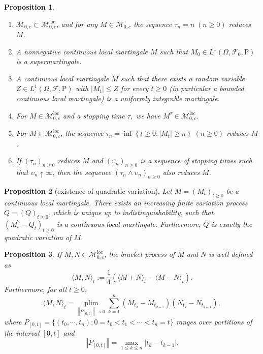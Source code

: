 \documentclass{report}
\newtheorem{proposition}{Proposition}[section]
\theoremstyle{nonumberplain}
\begin{document}
\begin{proposition}~\\
	\begin{enumerate}
		\item $\mathscr{M}_{0,c}\subset\mathscr{M}^{\mathrm{loc}}_{0,c}$, and for any $M\in\mathscr{M}_{0,c}$ the sequence $\tau_{n}=n\;(n\ge0)$ reduces $M$. 
		\item A nonnegative continuous local martingale $M$ such that $M_{0} \in L^{1}(\Omega,\mathcal{F}_0,\mathrm{P})$ is a supermartingale.
		\item A continuous local martingale $M$ such that there exists a random variable $Z \in L^{1}(\Omega,\mathcal{F},\mathrm{P})$ with $\left|M_{t}\right| \leq Z$ for every $t \geq 0$ (in particular a bounded continuous local martingale) is a uniformly integrable martingale.
		\item For $M \in \mathscr{M}^{\mathrm{loc}}_{0,c}$ and a stopping time $\tau,$ we have $M^{\tau} \in \mathscr{M}^{\mathrm{loc}}_{0,c}$.
		\item For $M \in \mathscr{M}^{\mathrm{loc}}_{0,c}$, the sequence
		$\tau_{n}=\inf \left\{t \geq 0:\left|M_{t}\right| \geq n\right\}\;(n\ge0)$	reduces $M$.
		\item If $\left(\tau_{n}\right)_{n\ge0}$ reduces $M$ and $\left(\upsilon_{n}\right)_{n\ge0}$ is a sequence of stopping times such that $\upsilon_{n} \uparrow \infty$, then the sequence $\left(\tau_{n} \wedge \upsilon_{n}\right)_{n\ge0}$ also reduces $M$.
	\end{enumerate}
\end{proposition}

\begin{proposition}[existence of quadratic variation]	
	Let $M=\left(M_{t}\right)_{t \geq 0}$ be a continuous local martingale. There exists an	increasing finite variation process $Q=\left(Q\right)_{t \geq 0}$, which is unique up to indistinguishability, such that $(M_{t}^{2}-Q_{t})_{t \geq 0}$ is a continuous local martingale. Furthermore, $Q$ is exactly the quadratic variation of $M$.
\end{proposition}

\begin{proposition}
	If $M,N\in \mathscr{M}^{\mathrm{loc}}_{0,c}$, the bracket process of $M$ and $N$ is well defined as
	\[
	\langle M, N\rangle_{t}:=\frac{1}{4}\left(\langle M+N\rangle_{t}-\langle M-N\rangle_{t}\right).
	\]
	Furthermore, for all $t\ge0$,
	\[
	\langle M, N\rangle_{t}=\mathop{\mathrm{plim}}\limits_{\left\Vert P_{[0,t]}\right\Vert \rightarrow 0} \sum_{k=1}^{n}\left(M_{t_{k}}-M_{t_{k-1}}\right)\left(N_{t_{k}}-N_{t_{k-1}}\right),
	\]
	where $P_{[0,t]}=\{(t_0,\cdots,t_n):0=t_0<t_1<\cdots<t_n=t\}$ ranges over partitions of the interval $[0,t]$ and 
	\[
	\left\Vert P_{[0,t]}\right\Vert=\max\limits_{1\le k\le n}{|t_k-t_{k-1}|}.
	\]
\end{proposition}
\end{document}
